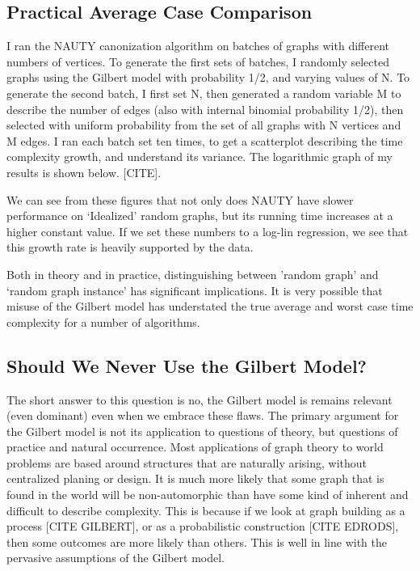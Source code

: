 \documentclass[11pt,a4paper]{report}
\begin{document}
\subsection{Practical Average Case Comparison}

I ran the NAUTY canonization algorithm on batches of graphs with different numbers of vertices.
To generate the first sets of batches, I randomly selected graphs using the Gilbert model with probability 1/2, and varying values of N.
To generate the second batch, I first set N, then generated a random variable M to describe the number of edges (also with internal binomial probability 1/2), then selected with uniform probability from the set of all graphs with N vertices and M edges.
I ran each batch set ten times, to get a scatterplot describing the time complexity growth, and understand its variance.
The logarithmic graph of my results is shown below.  [CITE].

We can see from these figures that not only does NAUTY have slower performance on `Idealized' random graphs, but its running time increases at a higher constant value.
If we set these numbers to a log-lin regression, we see that this growth rate is heavily supported by the data.

Both in theory and in practice, distinguishing between 'random graph' and `random graph instance' has significant implications.
It is very possible that misuse of the Gilbert model has understated the true average and worst case time complexity for a number of algorithms.

\subsection{Should We Never Use the Gilbert Model?}

The short answer to this question is no, the Gilbert model is remains relevant (even dominant) even when we embrace these flaws.
The primary argument for the Gilbert model is not its application to questions of theory, but questions of practice and natural occurrence.
Most applications of graph theory to world problems are based around structures that are naturally arising, without centralized planing or design.
It is much more likely that some graph that is found in the world will be non-automorphic than have some kind of inherent and difficult to describe complexity.
This is because if we look at graph building as a process [CITE GILBERT], or as a probabilistic construction [CITE EDRODS], then some outcomes are more likely than others.
This is well in line with the pervasive assumptions of the Gilbert model.  
\end{document}
